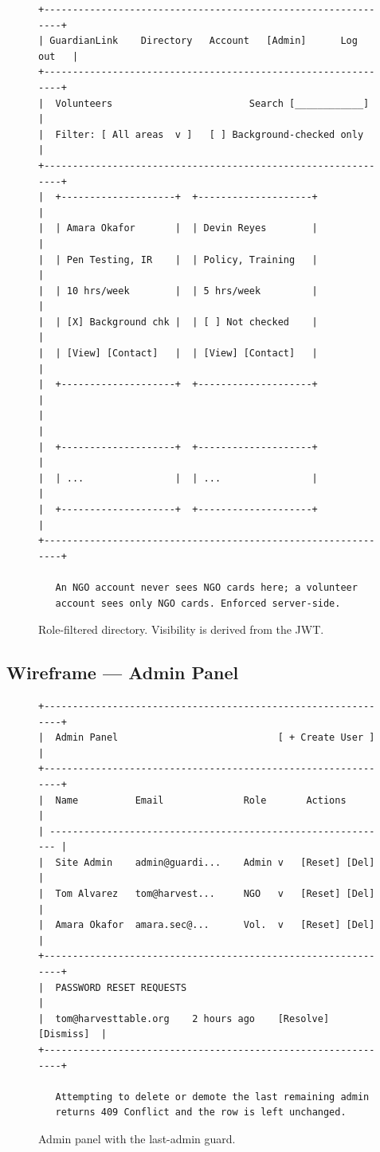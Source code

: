\documentclass[11pt,letterpaper]{article}
\begin{document}
\begin{figure}[H]
\centering
\begin{BVerbatim}[fontsize=\footnotesize]
+--------------------------------------------------------------+
| GuardianLink    Directory   Account   [Admin]      Log out   |
+--------------------------------------------------------------+
|  Volunteers                        Search [____________]     |
|  Filter: [ All areas  v ]   [ ] Background-checked only      |
+--------------------------------------------------------------+
|  +--------------------+  +--------------------+              |
|  | Amara Okafor       |  | Devin Reyes        |              |
|  | Pen Testing, IR    |  | Policy, Training   |              |
|  | 10 hrs/week        |  | 5 hrs/week         |              |
|  | [X] Background chk |  | [ ] Not checked    |              |
|  | [View] [Contact]   |  | [View] [Contact]   |              |
|  +--------------------+  +--------------------+              |
|                                                              |
|  +--------------------+  +--------------------+              |
|  | ...                |  | ...                |              |
|  +--------------------+  +--------------------+              |
+--------------------------------------------------------------+

   An NGO account never sees NGO cards here; a volunteer
   account sees only NGO cards. Enforced server-side.
\end{BVerbatim}
\caption{Role-filtered directory. Visibility is derived from the JWT.}
\end{figure}

\subsection{Wireframe --- Admin Panel}

\begin{figure}[H]
\centering
\begin{BVerbatim}[fontsize=\footnotesize]
+--------------------------------------------------------------+
|  Admin Panel                            [ + Create User ]    |
+--------------------------------------------------------------+
|  Name          Email              Role       Actions         |
| ------------------------------------------------------------ |
|  Site Admin    admin@guardi...    Admin v   [Reset] [Del]    |
|  Tom Alvarez   tom@harvest...     NGO   v   [Reset] [Del]    |
|  Amara Okafor  amara.sec@...      Vol.  v   [Reset] [Del]    |
+--------------------------------------------------------------+
|  PASSWORD RESET REQUESTS                                     |
|  tom@harvesttable.org    2 hours ago    [Resolve] [Dismiss]  |
+--------------------------------------------------------------+

   Attempting to delete or demote the last remaining admin
   returns 409 Conflict and the row is left unchanged.
\end{BVerbatim}
\caption{Admin panel with the last-admin guard.}
\end{figure}
\end{document}
